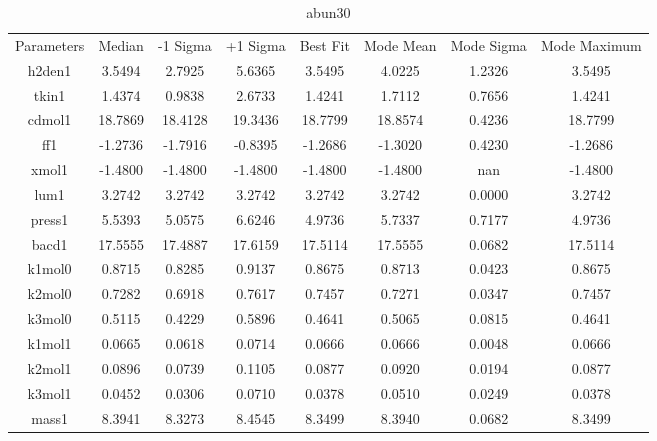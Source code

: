 \begin{table}
\caption{abun30}
\begin{tabular}{cccccccc}
Parameters & Median & -1 Sigma & +1 Sigma & Best Fit & Mode Mean & Mode Sigma & Mode Maximum \\
h2den1 & 3.5494 & 2.7925 & 5.6365 & 3.5495 & 4.0225 & 1.2326 & 3.5495 \\
tkin1 & 1.4374 & 0.9838 & 2.6733 & 1.4241 & 1.7112 & 0.7656 & 1.4241 \\
cdmol1 & 18.7869 & 18.4128 & 19.3436 & 18.7799 & 18.8574 & 0.4236 & 18.7799 \\
ff1 & -1.2736 & -1.7916 & -0.8395 & -1.2686 & -1.3020 & 0.4230 & -1.2686 \\
xmol1 & -1.4800 & -1.4800 & -1.4800 & -1.4800 & -1.4800 & nan & -1.4800 \\
lum1 & 3.2742 & 3.2742 & 3.2742 & 3.2742 & 3.2742 & 0.0000 & 3.2742 \\
press1 & 5.5393 & 5.0575 & 6.6246 & 4.9736 & 5.7337 & 0.7177 & 4.9736 \\
bacd1 & 17.5555 & 17.4887 & 17.6159 & 17.5114 & 17.5555 & 0.0682 & 17.5114 \\
k1mol0 & 0.8715 & 0.8285 & 0.9137 & 0.8675 & 0.8713 & 0.0423 & 0.8675 \\
k2mol0 & 0.7282 & 0.6918 & 0.7617 & 0.7457 & 0.7271 & 0.0347 & 0.7457 \\
k3mol0 & 0.5115 & 0.4229 & 0.5896 & 0.4641 & 0.5065 & 0.0815 & 0.4641 \\
k1mol1 & 0.0665 & 0.0618 & 0.0714 & 0.0666 & 0.0666 & 0.0048 & 0.0666 \\
k2mol1 & 0.0896 & 0.0739 & 0.1105 & 0.0877 & 0.0920 & 0.0194 & 0.0877 \\
k3mol1 & 0.0452 & 0.0306 & 0.0710 & 0.0378 & 0.0510 & 0.0249 & 0.0378 \\
mass1 & 8.3941 & 8.3273 & 8.4545 & 8.3499 & 8.3940 & 0.0682 & 8.3499 \\
\end{tabular}
\end{table}
